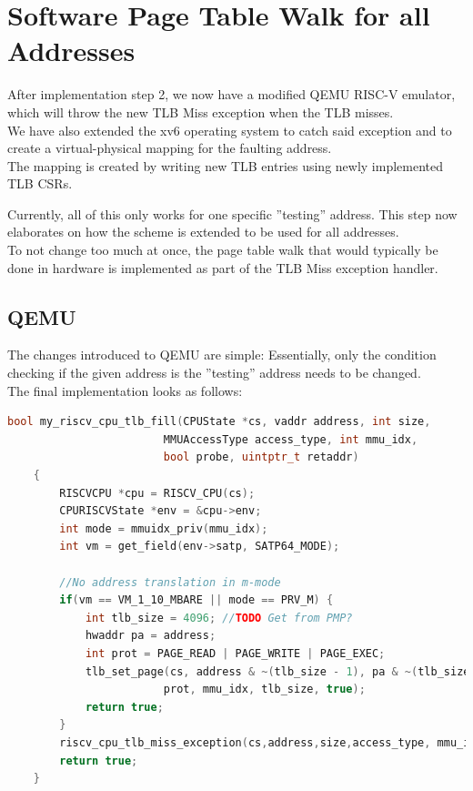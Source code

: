 

\section{Software Page Table Walk for all Addresses}
After implementation step 2, we now have a modified QEMU RISC-V emulator, which will throw the new
TLB Miss exception when the TLB misses.\\
We have also extended the xv6 operating system to catch said exception and to create a virtual-physical
mapping for the faulting address.\\
The mapping is created by writing new TLB entries using newly implemented TLB CSRs.

Currently, all of this only works for one specific ''testing'' address. This step now elaborates on
how the scheme is extended to be used for all addresses.\\
To not change too much at once, the page table walk that would typically be done in hardware is
implemented as part of the TLB Miss exception handler.

\subsection{QEMU}
The changes introduced to QEMU are simple: Essentially, only the condition checking if the given address is
the ''testing'' address needs to be changed.\\
The final implementation looks as follows:

\begin{lstlisting}[language=c,float=h!,
    caption={},
    label={lst:updatedTLBFill}]
    bool my_riscv_cpu_tlb_fill(CPUState *cs, vaddr address, int size,
                        MMUAccessType access_type, int mmu_idx,
                        bool probe, uintptr_t retaddr)
    {
        RISCVCPU *cpu = RISCV_CPU(cs);
        CPURISCVState *env = &cpu->env;
        int mode = mmuidx_priv(mmu_idx);
        int vm = get_field(env->satp, SATP64_MODE);

        //No address translation in m-mode
        if(vm == VM_1_10_MBARE || mode == PRV_M) {
            int tlb_size = 4096; //TODO Get from PMP?
            hwaddr pa = address;
            int prot = PAGE_READ | PAGE_WRITE | PAGE_EXEC;
            tlb_set_page(cs, address & ~(tlb_size - 1), pa & ~(tlb_size - 1),
                        prot, mmu_idx, tlb_size, true);
            return true;
        }
        riscv_cpu_tlb_miss_exception(cs,address,size,access_type, mmu_idx, probe, retaddr);
        return true;
    }
\end{lstlisting}

